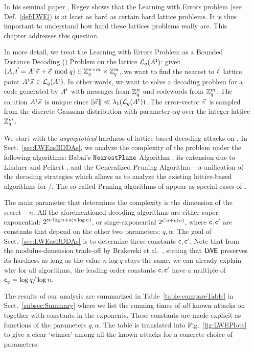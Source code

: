 In his seminal paper \cite{STOC:Regev05}, Regev shows that the Learning with Errors problem (see Def.~\ref{def:LWE}) is at least as hard as certain hard lattice problems. It is thus important to understand how hard these lattices problems really are. This chapter addresses this question.

In more detail, we treat the Learning with Errors Problem as a Bounded Distance Decoding (\BDD) Problem on the lattice $\mathcal{L}_q(A\mkern0.7mu^{\mathsf{ t}})$: given $(\AMat, \tvec = \AMat\transpose \svec + \evec \bmod q) \in \Z_q^{n \times m} \times \Z_q^m$, we want to find the nearest to $\tvec$ lattice point $\AMat\transpose \svec \in \qLat(A\transpose)$. In other words, we want to solve a decoding problem for a code generated by $A\mkern0.7mu^{\mathsf{ t}}$ with messages from ${{\mathbb Z}}_q^n$ and codewords from ${{\mathbb Z}}_q^m$. The solution $\AMat\transpose \svec$ is unique since $\norm{\evec} \ll \lambda_1(\qLat(\AMat\transpose))$.  The error-vector $\evec$ is sampled from the discrete Gaussian distribution with parameter $\alpha q$ over the integer lattice ${{\mathbb Z}}_q^m$.

We start with the \emph{asymptotical} hardness of lattice-based decoding attacks on \LWE. In Sect.~\ref{sec:LWEasBDDAs}, we analyze the complexity of the problem under the following algorithms: Babai's $\texttt{NearestPlane}$ Algorithm \cite{STACS:Babai85}, its extension due to Lindner and Peikert \cite{RSA:LinPei11}, and the Generalized Pruning Algorithm \GenPrun{}  -- a unification of the decoding strategies which allows us to analyze the existing lattice-based algorithms for \LWE/\BDD. The so-called Pruning algorithms of \cite{EC:GamNguReg10, RSA:LiuNgu13} appear as special cases of \GenPrun.

The main \LWE parameter that determines the complexity is the dimension of the secret -- $n$. All the aforementioned decoding algorithms are either super-exponential: $2^{\mathsf{c} n \log n + o(n \log n)}$, or singe-exponential $2^{\mathsf{c}' n + o(n)}$, where $\mathsf{c}, \mathsf{c}'$ are constants that depend on the other two \LWE parameters: $q, \alpha$. The goal of Sect.~\ref{sec:LWEasBDDAs} is to determine these constants $\mathsf{c}, \mathsf{c}'$. Note that from the modulus-dimension trade-off by Brakerski et al.\ \cite{STOC:BLPRS13}, stating that $\textsf{LWE}$ preserves its hardness as long as the value $n\log q$ stays the same,  we can already explain why for all algorithms, the leading order constants $\mathsf{c}, \mathsf{c}'$ have a multiple of $\mathsf{c}_q = \log q/ \log n$. 

The results of our analysis are summarized in Table~\ref{table:compareTable} in Sect.~\ref{subsec:Summary} where we list the running times of \emph{all} known attacks on \LWE together with constants in the exponents. These constants are made explicit as functions of the \LWE parameters $q, \alpha$. The table is translated into Fig.~\ref{fig:LWEPlots} to give a clear `winner' among all the known attacks for a concrete choice of \LWE parameters.

